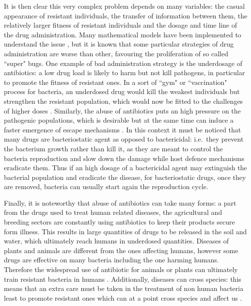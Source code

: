 It is then clear this very complex problem depends on many variables: the casual appearance of resistant individuals, the transfer of information between them, the relatively larger fitness of resistant individuals and the dosage and time line of the drug administration. Many mathematical models have been implemented to understand the issue \cite{Birkegard2018,Niewiadomska2019}, but it is known that some particular strategies of drug administration are worse than other, favouring the proliferation of so called ``super" bugs.
%
One example of bad administration strategy is the underdosage of antibiotics: a low drug load is likely to harm but not kill pathogens, in particular to promote the fitness of resistant ones. In a sort of ``gym" or ``vaccination" process for bacteria, an underdosed drug would kill the weakest individuals but strengthen the resistant population, which would now be fitted to the challenges of higher doses \cite{????}.
%
Similarly, the abuse of antibiotics puts an high pressure on the pathogenic populations, which is desirable but at the same time can induce a faster emergence of escape mechanisms \cite{????}.
%
In this context it must be noticed that many drugs are bacteriostatic agent as opposed to bactericidal: i.e.\ they prevent the bacterium growth rather than kill it, as they are meant to control the bacteria reproduction and slow down the damage while host defence mechanisms eradicate them.
%
Thus if an high dosage of a bactericidal agent may extinguish the bacterial population and eradicate the disease, for bacteriostatic drugs, once they are removed, bacteria can usually start again the reproduction cycle.

Finally, it is noteworthy that abuse of antibiotics can take many forms: a part from the drugs used to treat human related diseases, the agricultural and breeding sectors are constantly using antibiotics to keep their products secure form illness. This results in large quantities of drugs to be released in the soil and water, which ultimately reach humans in underdosed quantities. Diseases of plants and animals are different from the ones affecting humans, however some drugs are effective on many bacteria including the one harming humans. Therefore the widespread use of antibiotic for animals or plants can ultimately train resistant bacteria in humans \cite{????}.
%
Additionally, diseases can cross species: this means that an extra care must be taken in the treatment of non human bacteria least to promote resistant ones which can at a point cross species and affect us \cite{????}.

